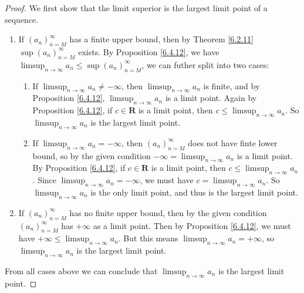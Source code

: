 \begin{proof}
    We first show that the limit superior is the largest limit point of a sequence.
    \begin{enumerate}
        \item If \((a_n)_{n = M}^\infty\) has a finite upper bound, then by Theorem \ref{6.2.11} \(\sup(a_n)_{n = M}^\infty\) exists.
              By Proposition \ref{6.4.12}, we have \(\limsup_{n \to \infty} a_n \leq \sup(a_n)_{n = M}^\infty\), we can futher split into two cases:
              \begin{enumerate}[label=(\Roman*)]
                  \item If \(\limsup_{n \to \infty} a_n \neq -\infty\), then \(\limsup_{n \to \infty} a_n\) is finite, and by Proposition \ref{6.4.12}, \(\limsup_{n \to \infty} a_n\) is a limit point.
                        Again by Proposition \ref{6.4.12}, if \(c \in \mathbf{R}\) is a limit point, then \(c \leq \limsup_{n \to \infty} a_n\).
                        So \(\limsup_{n \to \infty} a_n\) is the largest limit point.
                  \item If \(\limsup_{n \to \infty} a_n = -\infty\), then \((a_n)_{n = M}^\infty\) does not have finte lower bound, so by the given condition \(-\infty = \limsup_{n \to \infty} a_n\) is a limit point.
                        By Proposition \ref{6.4.12}, if \(c \in \mathbf{R}\) is a limit point, then \(c \leq \limsup_{n \to \infty} a_n\).
                        Since \(\limsup_{n \to \infty} a_n = -\infty\), we must have \(c = \limsup_{n \to \infty} a_n\).
                        So \(\limsup_{n \to \infty} a_n\) is the only limit point, and thus is the largest limit point.
              \end{enumerate}
        \item If \((a_n)_{n = M}^\infty\) has no finite upper bound, then by the given condition \((a_n)_{n = M}^\infty\) has \(+\infty\) as a limit point.
              Then by Proposition \ref{6.4.12}, we must have \(+\infty \leq \limsup_{n \to \infty} a_n\).
              But this means \(\limsup_{n \to \infty} a_n = +\infty\), so \(\limsup_{n \to \infty} a_n\) is the largest limit point.
    \end{enumerate}
    From all cases above we can conclude that \(\limsup_{n \to \infty} a_n\) is the largest limit point.


\end{proof}
